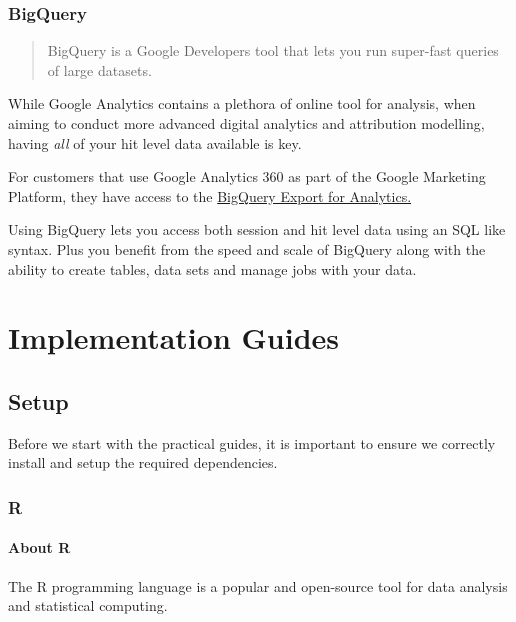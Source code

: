 \documentclass[]{book}
\begin{document}
\hypertarget{bigquery}{%
\section{BigQuery}\label{bigquery}}

\begin{quote}
BigQuery is a Google Developers tool that lets you run super-fast queries of
large datasets.
\end{quote}

While Google Analytics contains a plethora of online tool for analysis, when
aiming to conduct more advanced digital analytics and attribution modelling,
having \emph{all} of your hit level data available is key. \citep{noauthor_bigquery_nodate}

For customers that use Google Analytics 360 as part of the Google Marketing Platform,
they have access to the \href{https://support.google.com/analytics/answer/3437618?hl=en\&ref_topic=3416089}{BigQuery Export for Analytics.}

Using BigQuery lets you access both session and hit level data using an SQL
like syntax. Plus you benefit from the speed and scale of BigQuery along with
the ability to create tables, data sets and manage jobs with your data.

\hypertarget{part-implementation-guides}{%
\part{Implementation Guides}\label{part-implementation-guides}}

\hypertarget{setup}{%
\chapter{Setup}\label{setup}}

Before we start with the practical guides, it is important to ensure we
correctly install and setup the required dependencies.

\hypertarget{r}{%
\section{R}\label{r}}

\hypertarget{about-r}{%
\subsection{About R}\label{about-r}}

The R programming language \citep{R-base} is a popular and open-source tool
for data analysis and statistical computing.
\end{document}
